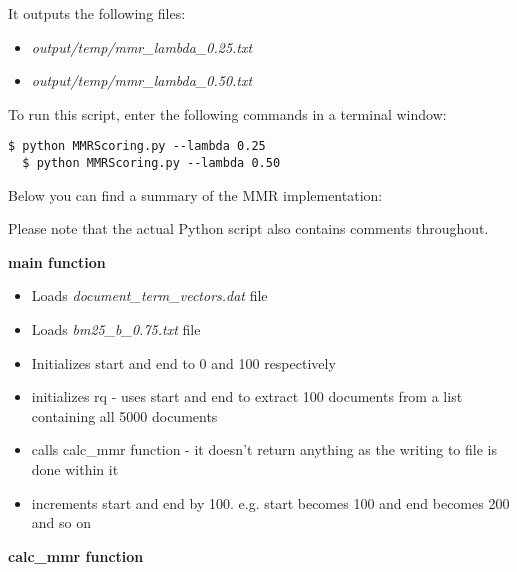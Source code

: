 \documentclass{article} %
\begin{document}
It outputs the following files:

\begin{itemize}
    \item \textit{output/temp/mmr\_lambda\_0.25.txt}
    \item \textit{output/temp/mmr\_lambda\_0.50.txt}
\end{itemize}

To run this script, enter the following commands in a terminal window:

\begin{lstlisting}[style=Bash]
  $ python MMRScoring.py --lambda 0.25
  $ python MMRScoring.py --lambda 0.50
\end{lstlisting}

Below you can find a summary of the MMR implementation:

Please note that the actual Python script also contains comments throughout.

\textbf{main function}

\begin{itemize}
    \item Loads \textit{document\_term\_vectors.dat} file
    \item Loads \textit{bm25\_b\_0.75.txt} file
    \item Initializes start and end to 0 and 100 respectively
    \item initializes rq - uses start and end to extract 100 documents from a list containing all 5000 documents
    \item calls calc\_mmr function - it doesn't return anything as the writing to file is done within it
    \item increments start and end by 100. e.g. start becomes 100 and end becomes 200 and so on
\end{itemize}

\textbf{calc\_mmr function}
\end{document}
